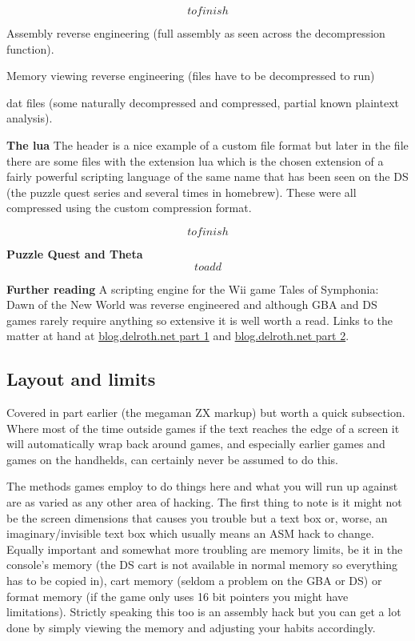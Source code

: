\documentclass[
]{book}
\begin{document}
\[to finish\]

Assembly reverse engineering (full assembly as seen across the decompression function).

Memory viewing reverse engineering (files have to be decompressed to run)

dat files (some naturally decompressed and compressed, partial known plaintext analysis).

\textbf{The lua} The header is a nice example of a custom file format but later in the file there are some files with the extension lua which is the chosen extension of a fairly powerful scripting language of the same name that has been seen on the DS (the puzzle quest series and several times in homebrew). These were all compressed using the custom compression format.

\[to finish\]

\textbf{Puzzle Quest and Theta} \[to add\]

\textbf{Further reading} A scripting engine for the Wii game Tales of Symphonia: Dawn of the New World was reverse engineered and although GBA and DS games rarely require anything so extensive it is well worth a read. Links to the matter at hand at \href{http://blog.delroth.net/2011/06/reverse-engineering-a-wii-game-script-interpreter-part-1/}{blog.delroth.net part 1} and \href{http://blog.delroth.net/2011/06/reverse-engineering-a-wii-game-script-interpreter-part-2/}{blog.delroth.net part 2}.

\hypertarget{layout-and-limits}{%
\subsection{Layout and limits}\label{layout-and-limits}}

Covered in part earlier (the megaman ZX markup) but worth a quick subsection. Where most of the time outside games if the text reaches the edge of a screen it will automatically wrap back around games, and especially earlier games and games on the handhelds, can certainly never be assumed to do this.

The methods games employ to do things here and what you will run up against are as varied as any other area of hacking. The first thing to note is it might not be the screen dimensions that causes you trouble but a text box or, worse, an imaginary/invisible text box which usually means an ASM hack to change. Equally important and somewhat more troubling are memory limits, be it in the console's memory (the DS cart is not available in normal memory so everything has to be copied in), cart memory (seldom a problem on the GBA or DS) or format memory (if the game only uses 16 bit pointers you might have limitations). Strictly speaking this too is an assembly hack but you can get a lot done by simply viewing the memory and adjusting your habits accordingly.
\end{document}
